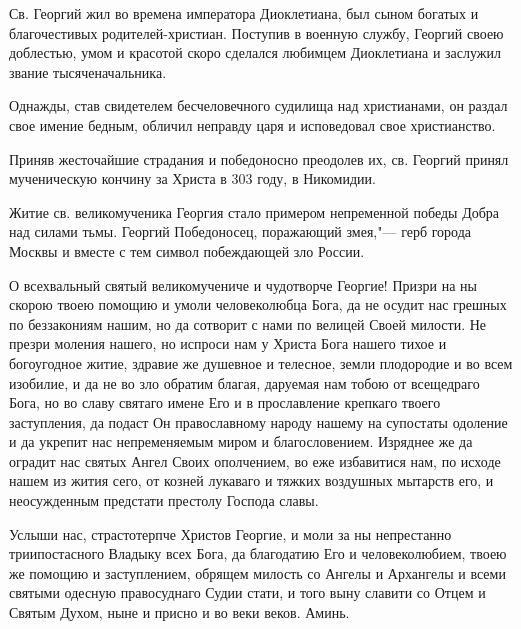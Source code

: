  

Св. Георгий жил во времена императора Диоклетиана, был сыном богатых и благочестивых родителей-христиан. Поступив в военную службу, Георгий своею доблестью, умом и красотой скоро сделался любимцем Диоклетиана и заслужил звание тысяченачальника. 

Однажды, став свидетелем бесчеловечного судилища над христианами, он раздал свое имение бедным, обличил неправду царя и исповедовал свое христианство. 

Приняв жесточайшие страдания и победоносно преодолев их, св. Георгий принял мученическую кончину за Христа в 303 году, в Никомидии. 

Житие св. великомученика Георгия стало примером непременной победы Добра над силами тьмы. Георгий Победоносец, поражающий змея,"--- герб города Москвы и вместе с тем символ побеждающей зло России.



О всехвальный святый великомучениче и чудотворче Георгие! Призри на ны скорою твоею помощию и умоли человеколюбца Бога, да не осудит нас грешных по беззакониям нашим, но да сотворит с нами по велицей Своей милости. Не презри моления нашего, но испроси нам у Христа Бога нашего тихое и богоугодное житие, здравие же душевное и телесное, земли плодородие и во всем изобилие, и да не во зло обратим благая, даруемая нам тобою от всещедраго Бога, но во славу святаго имене Его и в прославление крепкаго твоего заступления, да подаст Он православному народу нашему на супостаты одоление и да укрепит нас непременяемым миром и благословением. Изряднее же да оградит нас святых Ангел Своих ополчением, во еже избавитися нам, по исходе нашем из жития сего, от козней лукаваго и тяжких воздушных мытарств его, и неосужденным предстати престолу Господа славы. 

Услыши нас, страстотерпче Христов Георгие, и моли за ны непрестанно триипостасного Владыку всех Бога, да благодатию Его и человеколюбием, твоею же помощию и заступлением, обрящем милость со Ангелы и Архангелы и всеми святыми одесную правосуднаго Судии стати, и того выну славити со Отцем и Святым Духом, ныне и присно и во веки веков. Аминь.
\mychapterending

 
